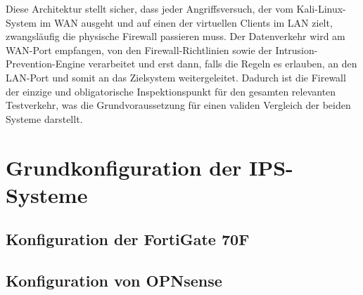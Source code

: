 Diese Architektur stellt sicher, dass jeder Angriffsversuch, der vom Kali-Linux-System im WAN ausgeht und auf einen der virtuellen Clients im LAN zielt, zwangsläufig die physische Firewall passieren muss. Der Datenverkehr wird am WAN-Port empfangen, von den Firewall-Richtlinien sowie der Intrusion-Prevention-Engine verarbeitet und erst dann, falls die Regeln es erlauben, an den LAN-Port und somit an das Zielsystem weitergeleitet. Dadurch ist die Firewall der einzige und obligatorische Inspektionspunkt für den gesamten relevanten Testverkehr, was die Grundvoraussetzung für einen validen Vergleich der beiden Systeme darstellt.

\section{Grundkonfiguration der IPS-Systeme}
\subsection{Konfiguration der FortiGate 70F}
\subsection{Konfiguration von OPNsense}